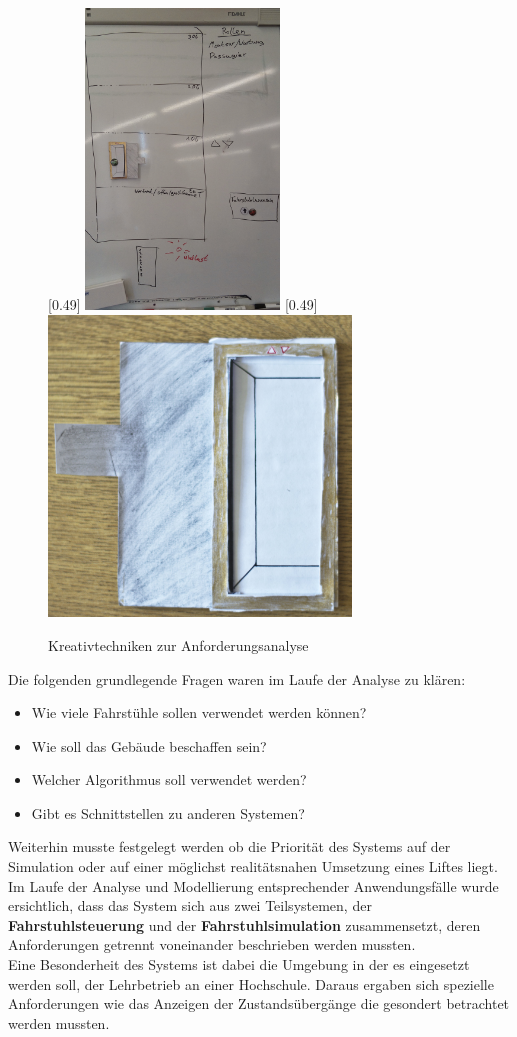 \begin{figure}[hbt]
\centering
{}[0.49\linewidth]
{\includegraphics[height=8cm]{images/kundengespraech1.jpg}}
[0.49\linewidth]
{\includegraphics[height=8cm]{images/pappfahrstuhl.jpg}}
\caption{Kreativtechniken zur Anforderungsanalyse}
\end{figure}
Die folgenden grundlegende Fragen waren im Laufe der Analyse zu klären:
\begin{itemize}
	\item Wie viele Fahrstühle sollen verwendet werden können?
	\item Wie soll das Gebäude beschaffen sein?
	\item Welcher Algorithmus soll verwendet werden?
	\item Gibt es Schnittstellen zu anderen Systemen?
\end{itemize}
Weiterhin musste festgelegt werden ob die Priorität des Systems auf der
Simulation oder auf einer möglichst realitätsnahen Umsetzung eines Liftes liegt.
Im Laufe der Analyse und Modellierung entsprechender Anwendungsfälle
wurde ersichtlich, dass das System sich aus zwei Teilsystemen, der
\textbf{Fahrstuhlsteuerung} und der \textbf{Fahrstuhlsimulation} zusammensetzt,
deren Anforderungen getrennt voneinander beschrieben werden mussten.\\
Eine Besonderheit des Systems ist dabei die Umgebung in der es eingesetzt werden
soll, der Lehrbetrieb an einer Hochschule. Daraus ergaben sich spezielle
Anforderungen wie das Anzeigen der Zustandsübergänge die gesondert betrachtet
werden mussten.

